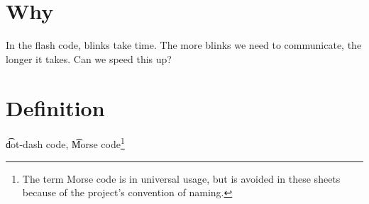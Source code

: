 
\section*{Why}

In the flash code, blinks take time.
The more blinks we need to communicate, the longer it takes.
Can we speed this up?

\section*{Definition}

\t{dot-dash code},
\t{Morse code}\footnote{The term Morse code is in universal usage, but is avoided in these sheets because of the project's convention of naming.}

\blankpage